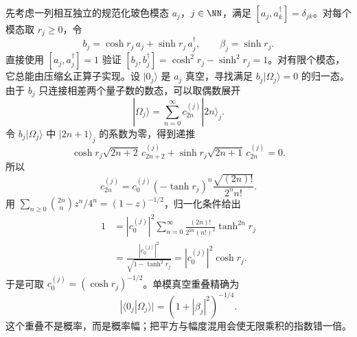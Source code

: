 先考虑一列相互独立的规范化玻色模态 $a_j$，$j\in\NN$，满足 $[a_j,a_k^\dagger]=\delta_{jk}$。对每个模态取 $r_j\ge0$，令
\begin{equation}\label{eq:ghs-r7-diagonal-bogoliubov}
 b_j=\cosh r_j\,a_j+\sinh r_j\,a_j^\dagger,
 \qquad \beta_j=\sinh r_j.
\end{equation}
直接使用 $[a_j,a_j^\dagger]=1$ 验证
$[b_j,b_j^\dagger]=\cosh^2r_j-\sinh^2r_j=1$。对有限个模态，它总能由压缩幺正算子实现。设 $|0_j\rangle$ 是 $a_j$ 真空，寻找满足 $b_j|\Omega_j\rangle=0$ 的归一态。由于 $b_j$ 只连接相差两个量子数的数态，可以取偶数展开
\[
 |\Omega_j\rangle=\sum_{n=0}^\infty c_{2n}^{(j)}|2n\rangle_j.
\]
令 $b_j|\Omega_j\rangle$ 中 $|2n+1\rangle_j$ 的系数为零，得到递推
\[
 \cosh r_j\sqrt{2n+2}\,c_{2n+2}^{(j)}
 +\sinh r_j\sqrt{2n+1}\,c_{2n}^{(j)}=0.
\]
所以
\begin{equation}\label{eq:ghs-r7-squeezed-single-coeff}
 c_{2n}^{(j)}=c_0^{(j)}(-\tanh r_j)^n
 \frac{\sqrt{(2n)!}}{2^n n!}.
\end{equation}
用 $\sum_{n\ge0}\binom{2n}{n}z^n/4^n=(1-z)^{-1/2}$，归一化条件给出
\begin{align*}
 1&=|c_0^{(j)}|^2\sum_{n=0}^\infty
 \frac{(2n)!}{2^{2n}(n!)^2}\tanh^{2n}r_j\\
 &=\frac{|c_0^{(j)}|^2}{\sqrt{1-\tanh^2r_j}}
 =|c_0^{(j)}|^2\cosh r_j.
\end{align*}
于是可取 $c_0^{(j)}=(\cosh r_j)^{-1/2}$。单模真空重叠精确为
\begin{equation}\label{eq:ghs-r7-squeeze-vacuum-overlap}
 |\langle0_j|\Omega_j\rangle|
 =(1+|\beta_j|^2)^{-1/4}.
\end{equation}
这个重叠不是概率，而是概率幅；把平方与幅度混用会使无限乘积的指数错一倍。

